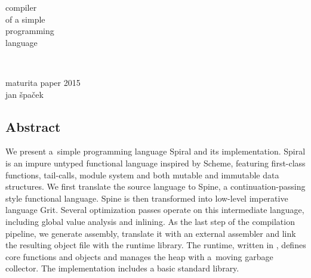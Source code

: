 \begin{titlingpage}
  \sffamily
  \begin{flushright}
    \fontsize{50}{60}\selectfont
    compiler\\
    of a simple\\
    programming\\
    language
  \end{flushright}
  ~\\[15cm]
  \begin{flushleft}
    \fontsize{16}{19}\selectfont
    maturita paper 2015\\
    \fontsize{20}{24}\selectfont
    jan špaček\\
  \end{flushleft}
\end{titlingpage}

\thispagestyle{empty}
\cleardoublepage

\begin{adjustwidth}{1.5cm}{1.5cm}

\section*{Abstract}

We present a~simple programming language Spiral and its implementation. Spiral
is an impure untyped functional language inspired by Scheme, featuring
first-class functions, tail-calls, module system and both mutable and immutable
data structures. We first translate the source language to Spine, a
continuation-passing style functional language. Spine is then transformed into
low-level imperative language Grit. Several optimization passes operate on this
intermediate language, including global value analysis and inlining. As the last
step of the compilation pipeline, we generate assembly, translate it with an
external assembler and link the resulting object file with the runtime library.
The runtime, written in \Cplusplus, defines core functions and objects and
manages the heap with a~moving garbage collector. The implementation includes a
basic standard library.

\end{adjustwidth}

\newpage

\tableofcontents
